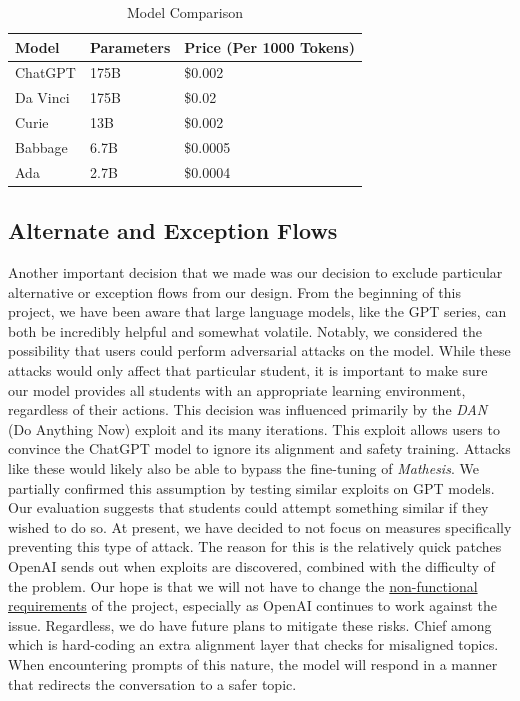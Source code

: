 \documentclass[12pt,a4paper]{article}
\begin{document}
    \begin{table}[H]
        \caption{Model Comparison\cite{openAiPricing}}
        \label{tab:modelComparison}
        \centering
        \begin{tabular}{|p{3cm}|p{3cm}|p{5cm}|}
            \hline
            \textbf{Model} & \textbf{Parameters} & \textbf{Price (Per 1000 Tokens)}\\
            \hline
            ChatGPT & 175B & \$0.002\\
            \hline
            Da Vinci & 175B & \$0.02\\
            \hline
            Curie & 13B & \$0.002\\
            \hline
            Babbage & 6.7B & \$0.0005\\
            \hline
            Ada & 2.7B & \$0.0004\\
            \hline
        \end{tabular}
    \end{table}

    \subsection{Alternate and Exception Flows}

    Another important decision that we made was our decision to exclude particular alternative or
    exception flows from our design.  From the beginning of this project, we have been aware that
    large language models, like the GPT series, can both be incredibly helpful and somewhat volatile.
    Notably, we considered the possibility that users could perform adversarial attacks on the model.
    While these attacks would only affect that particular student, it is important to make sure
    our model provides all students with an appropriate learning environment, regardless of their actions.
    This decision was influenced primarily by the \textit{DAN}~\cite{danThread, danReadme} (Do Anything Now)
    exploit and its many iterations.  This exploit allows users to convince the ChatGPT model to
    ignore its alignment and safety training.  Attacks like these would likely also be able to
    bypass the fine-tuning of \textit{Mathesis}.  We partially confirmed this assumption by testing
    similar exploits on GPT models.  Our evaluation suggests that students could attempt something
    similar if they wished to do so.  At present, we have decided to not focus on measures
    specifically preventing this type of attack.  The reason for this is the relatively quick
    patches OpenAI sends out when exploits are discovered, combined with the difficulty of the
    problem.  Our hope is that we will not have to change the \hyperref[nonFunctionalReqs]{non-functional requirements}
    of the project, especially as OpenAI continues to work against the issue.  Regardless, we do
    have future plans to mitigate these risks.  Chief among which is hard-coding an extra alignment
    layer that checks for misaligned topics.  When encountering prompts of this nature, the model
    will respond in a manner that redirects the conversation to a safer topic.
\end{document}
